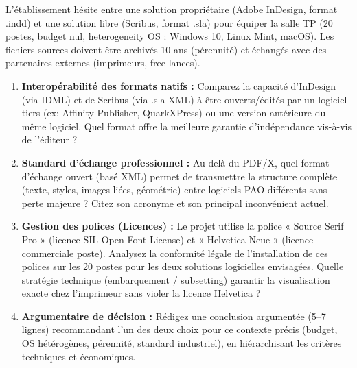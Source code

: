 \documentclass[11pt]{article}
\begin{document}
\begin{exercice}
L'établissement hésite entre une solution propriétaire (Adobe InDesign, format .indd) et une solution libre (Scribus, format .sla) pour équiper la salle TP (20 postes, budget nul, heterogeneity OS : Windows 10, Linux Mint, macOS). Les fichiers sources doivent être archivés 10 ans (pérennité) et échangés avec des partenaires externes (imprimeurs, free-lances).

\begin{enumerate}
    \item \textbf{Interopérabilité des formats natifs :} Comparez la capacité d'InDesign (via IDML) et de Scribus (via .sla XML) à être ouverts/édités par un logiciel tiers (ex: Affinity Publisher, QuarkXPress) ou une version antérieure du même logiciel. Quel format offre la meilleure garantie d'indépendance vis-à-vis de l'éditeur ?
    \item \textbf{Standard d'échange professionnel :} Au-delà du PDF/X, quel format d'échange ouvert (basé XML) permet de transmettre la structure complète (texte, styles, images liées, géométrie) entre logiciels PAO différents sans perte majeure ? Citez son acronyme et son principal inconvénient actuel.
    \item \textbf{Gestion des polices (Licences) :} Le projet utilise la police « Source Serif Pro » (licence SIL Open Font License) et « Helvetica Neue » (licence commerciale poste). Analysez la conformité légale de l'installation de ces polices sur les 20 postes pour les deux solutions logicielles envisagées. Quelle stratégie technique (embarquement / subsetting) garantir la visualisation exacte chez l'imprimeur sans violer la licence Helvetica ?
    \item \textbf{Argumentaire de décision :} Rédigez une conclusion argumentée (5--7 lignes) recommandant l'un des deux choix pour ce contexte précis (budget, OS hétérogènes, pérennité, standard industriel), en hiérarchisant les critères techniques et économiques.
\end{enumerate}
\end{exercice}
\end{document}

